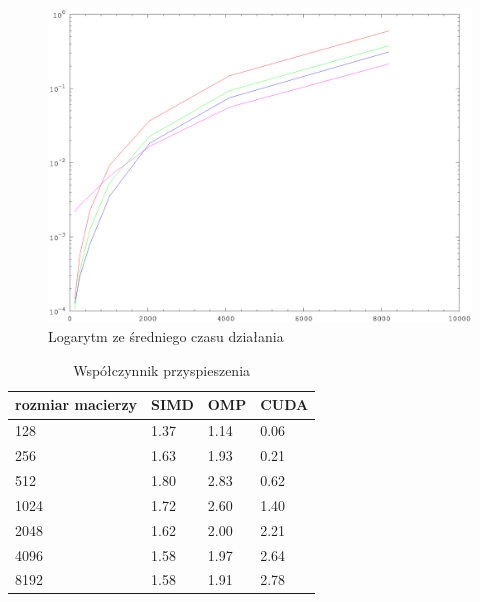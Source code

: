 \documentclass[11pt,a4paper]{article}
\begin{document}
\begin{figure}[h!]
\begin{center}
	\includegraphics[scale=0.45]{double_time_log}
	\caption{Logarytm ze średniego czasu działania}
	\label{fig:double_time_log}
\end{center}
\end{figure}

\newpage

\begin{table}[h!]
\begin{center}
\begin{tabular}{llll}
\toprule
rozmiar macierzy & SIMD & OMP & CUDA \\
\midrule
128 & 1.37 & 1.14 & 0.06 \\
256 & 1.63 & 1.93 & 0.21 \\
512 & 1.80 & 2.83 & 0.62 \\
1024 & 1.72 & 2.60 & 1.40 \\
2048 & 1.62 & 2.00 & 2.21 \\
4096 & 1.58 & 1.97 & 2.64 \\
8192 & 1.58 & 1.91 & 2.78 \\
\bottomrule
\end{tabular}
\caption{Współczynnik przyspieszenia}
\end{center}
\end{table}
\end{document}
